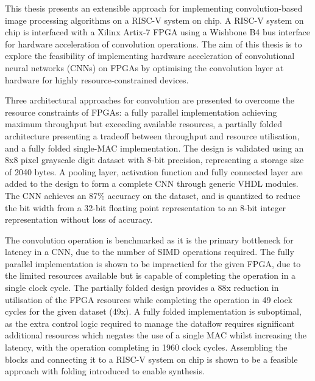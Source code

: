 

%

%




This thesis presents an extensible approach for implementing convolution-based image processing algorithms on a RISC-V system on chip. A RISC-V system on chip is interfaced with a Xilinx Artix-7 FPGA using a Wishbone B4 bus interface for hardware acceleration of convolution operations.
The aim of this thesis is to explore the feasibility of implementing hardware acceleration of convolutional neural networks (CNNs) on FPGAs by optimising the convolution layer at hardware for highly resource-constrained devices.

Three architectural approaches for convolution are presented to overcome the resource constraints of FPGAs: a fully parallel implementation achieving maximum throughput but exceeding available resources, a partially folded architecture presenting a tradeoff between throughput and resource utilisation, and a fully folded single-MAC implementation.
The design is validated using an 8x8 pixel grayscale digit dataset with 8-bit precision, representing a storage size of 2040 bytes. 
A pooling layer, activation function and fully connected layer are added to the design to form a complete CNN through generic VHDL modules.
The CNN achieves an 87\% accuracy on the dataset, and is quantized to reduce the bit width from a 32-bit floating point representation to an 8-bit integer representation without loss of accuracy.

The convolution operation is benchmarked as it is the primary bottleneck for latency in a CNN, due to the number of SIMD operations required.
The fully parallel implementation is shown to be impractical for the given FPGA, due to the limited resources available but is capable of completing the operation in a single clock cycle.
The partially folded design provides a 88x reduction in utilisation of the FPGA resources while completing the operation in 49 clock cycles for the given dataset (49x).
A fully folded implementation is suboptimal, as the extra control logic required to manage the dataflow requires significant additional resources which negates the use of a single MAC whilst increasing the latency, with the operation completing in 1960 clock cycles.
Assembling the blocks and connecting it to a RISC-V system on chip is shown to be a feasible approach with folding introduced to enable synthesis.

